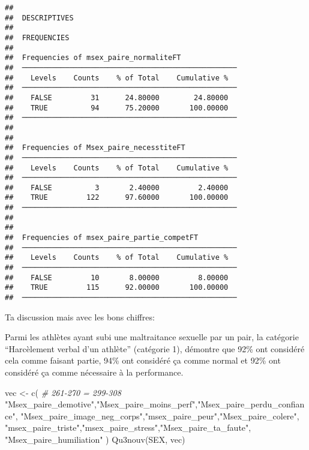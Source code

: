 \documentclass[
]{article}
\newenvironment{Shaded}{\begin{snugshade}}{\end{snugshade}}
\newcommand{\CommentTok}[1]{\textcolor[rgb]{0.56,0.35,0.01}{\textit{#1}}}
\newcommand{\FunctionTok}[1]{\textcolor[rgb]{0.00,0.00,0.00}{#1}}
\newcommand{\NormalTok}[1]{#1}
\newcommand{\OtherTok}[1]{\textcolor[rgb]{0.56,0.35,0.01}{#1}}
\newcommand{\StringTok}[1]{\textcolor[rgb]{0.31,0.60,0.02}{#1}}
\begin{document}
\begin{verbatim}
## 
##  DESCRIPTIVES
## 
##  FREQUENCIES
## 
##  Frequencies of msex_paire_normaliteFT              
##  ────────────────────────────────────────────────── 
##    Levels    Counts    % of Total    Cumulative %   
##  ────────────────────────────────────────────────── 
##    FALSE         31      24.80000        24.80000   
##    TRUE          94      75.20000       100.00000   
##  ────────────────────────────────────────────────── 
## 
## 
##  Frequencies of Msex_paire_necesstiteFT             
##  ────────────────────────────────────────────────── 
##    Levels    Counts    % of Total    Cumulative %   
##  ────────────────────────────────────────────────── 
##    FALSE          3       2.40000         2.40000   
##    TRUE         122      97.60000       100.00000   
##  ────────────────────────────────────────────────── 
## 
## 
##  Frequencies of msex_paire_partie_competFT          
##  ────────────────────────────────────────────────── 
##    Levels    Counts    % of Total    Cumulative %   
##  ────────────────────────────────────────────────── 
##    FALSE         10       8.00000         8.00000   
##    TRUE         115      92.00000       100.00000   
##  ──────────────────────────────────────────────────
\end{verbatim}

Ta discussion mais avec les bons chiffres:

Parmi les athlètes ayant subi une maltraitance sexuelle par un pair, la
catégorie ``Harcèlement verbal d'un athlète'' (catégorie 1), démontre
que 92\% ont considéré cela comme faisant partie, 94\% ont considéré ça
comme normal et 92\% ont considéré ça comme nécessaire à la performance.

\begin{Shaded}
\begin{Highlighting}[]
\NormalTok{vec }\OtherTok{\textless{}{-}} \FunctionTok{c}\NormalTok{(  }\CommentTok{\# 261{-}270 = 299{-}308}
  \StringTok{"Msex\_paire\_demotive"}\NormalTok{,}\StringTok{"Msex\_paire\_moins\_perf"}\NormalTok{,}\StringTok{"Msex\_paire\_perdu\_confiance"}\NormalTok{,}
  \StringTok{"Msex\_paire\_image\_neg\_corps"}\NormalTok{,}\StringTok{"msex\_paire\_peur"}\NormalTok{,}\StringTok{"Msex\_paire\_colere"}\NormalTok{,}
  \StringTok{"msex\_paire\_triste"}\NormalTok{,}\StringTok{"msex\_paire\_stress"}\NormalTok{,}\StringTok{"Msex\_paire\_ta\_faute"}\NormalTok{,}
  \StringTok{"Msex\_paire\_humiliation"}
\NormalTok{  )}
\FunctionTok{Qu3nouv}\NormalTok{(SEX, vec)}
\end{Highlighting}
\end{Shaded}
\end{document}

